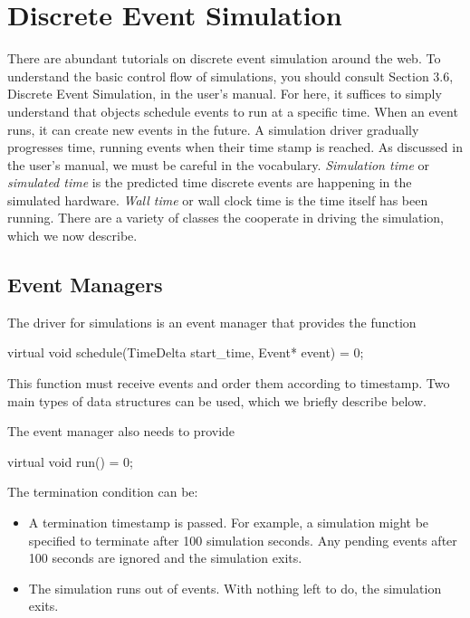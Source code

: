 

\chapter{Discrete Event Simulation}
\label{chapter:des}
There are abundant tutorials on discrete event simulation around the web.
To understand the basic control flow of \sstmacro simulations,
you should consult Section 3.6, Discrete Event Simulation, in the user's manual.
For here, it suffices to simply understand that objects schedule events to run at a specific time.
When an event runs, it can create new events in the future.
A simulation driver gradually progresses time, running events when their time stamp is reached.
As discussed in the user's manual, we must be careful in the vocabulary.
\emph{Simulation time} or \emph{simulated time} is the predicted time discrete events are happening in the simulated hardware.
\emph{Wall time} or {wall clock time} is the time \sstmacro itself has been running.
There are a variety of classes the cooperate in driving the simulation, which we now describe.

\section{Event Managers}
\label{sec:eventManagers}
The driver for simulations is an event manager that provides the function

\begin{CppCode}
virtual void schedule(TimeDelta start_time, Event* event) = 0;
\end{CppCode}
This function must receive events and order them according to timestamp.
Two main types of data structures can be used, which we briefly describe below.

The event manager also needs to provide

\begin{CppCode}
virtual void run() = 0;
\end{CppCode}

The termination condition can be:
\begin{itemize}
\item A termination timestamp is passed.  For example, a simulation might be specified to terminate after 100 simulation seconds. 
Any pending events after 100 seconds are ignored and the simulation exits.
\item The simulation runs out of events.  With nothing left to do, the simulation exits.
\end{itemize}

